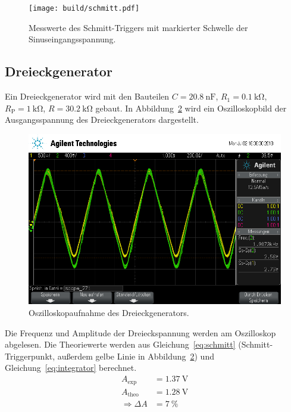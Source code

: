 \begin{figure}[ht]
  \centering
    \centering
    \texttt{[image: build/schmitt.pdf]}
    \caption{Messwerte des Schmitt-Triggers mit markierter Schwelle der Sinuseingangsspannung.}
    \label{fig:schmitt_plot}
  \label{fig:schmitt}
\end{figure}

\subsection{Dreieckgenerator}
Ein Dreieckgenerator wird mit den Bauteilen
$C = \SI{20.8}{\nano\farad}$,
$R_1 = \SI{0.1}{\kilo\ohm}$,
$R_\text{P} = \SI{1}{\kilo\ohm}$,
$R = \SI{30.2}{\kilo\ohm}$
gebaut.
In Abbildung~\ref{fig:dreieck_generator} wird ein Oszilloskopbild
der Ausgangsspannung des Dreieckgenerators dargestellt.
\begin{figure}[ht]
  \centering
  \includegraphics[height=0.3\textheight]{data/scope_271.png}
  \caption{Oszilloskopaufnahme des Dreieckgenerators.}
  \label{fig:dreieck_generator}
\end{figure}

Die Frequenz und Amplitude der Dreieckspannung werden am Oszilloskop abgelesen.
Die Theoriewerte werden aus Gleichung~\eqref{eq:schmitt} (Schmitt-Triggerpunkt, außerdem gelbe Linie in Abbildung~\ref{fig:dreieck_generator})
und Gleichung~\eqref{eq:integrator} berechnet.
\begin{align*}
  A_\text{exp} &= \SI{1.37}{\volt} \\
  A_\text{theo} &= \SI{1.28}{\volt} \\
  \Rightarrow \Delta A &= \SI{7}{\percent}
\end{align*}

